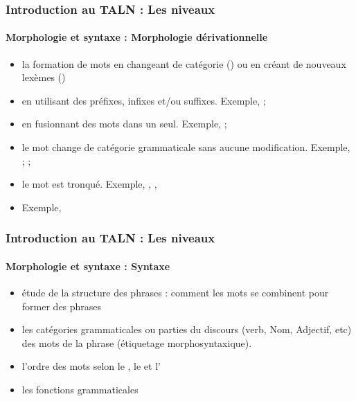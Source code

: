\documentclass[xcolor=table]{beamer}
\begin{document}
\begin{frame}
\frametitle{Introduction au TALN : Les niveaux}
\framesubtitle{Morphologie et syntaxe : Morphologie dérivationnelle}

\begin{itemize}
	\item la formation de mots en changeant de catégorie () ou en créant de nouveaux lexèmes ()
	
	\item {} en utilisant des préfixes, infixes et/ou suffixes. 
	Exemple, ; 
	\item {} en fusionnant des mots  dans un seul. 
	Exemple, ; 
	
	\item {} le mot change de catégorie grammaticale sans aucune modification. 
	Exemple, ; ; 
	
	\item {} le mot est tronqué. 
	Exemple, , , 
	
	\item {} Exemple,  
	
\end{itemize}

\end{frame}

\begin{frame}
\frametitle{Introduction au TALN : Les niveaux}
\framesubtitle{Morphologie et syntaxe : Syntaxe}

\begin{itemize}
	\item étude de la structure des phrases : comment les mots se combinent pour former des phrases
	\item les catégories grammaticales ou parties du discours (verb, Nom, Adjectif, etc) des mots de la phrase (étiquetage morphosyntaxique).
	\item l'ordre des mots selon le , le  et l'
	\item les fonctions grammaticales
\end{itemize}

\end{frame}
\end{document}
